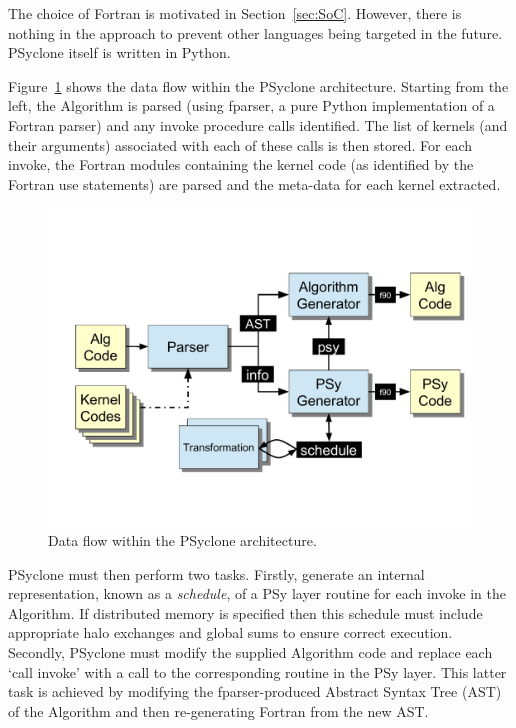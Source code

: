 \documentclass[review,times]{elsarticle}
\begin{document}
The choice of Fortran is motivated in Section~\ref{sec:SoC}. However, there is
nothing in the approach to prevent other languages being targeted in the
future. PSyclone itself is written in Python.

Figure~\ref{fig:psyclone-arch} shows the data flow within the PSyclone
architecture. Starting from the left, the Algorithm is parsed (using
fparser, a pure Python implementation of a Fortran parser) and any
invoke procedure calls identified. The list of kernels (and their arguments)
associated with each of these calls is then stored. For each invoke,
the Fortran modules containing the kernel code (as identified by
the Fortran use statements) are parsed and the meta-data for each kernel
extracted.

\begin{figure}
\centering\includegraphics[width=0.8\linewidth]{Fig5_psyclone_flow.pdf}
\caption{\label{fig:psyclone-arch}Data flow within the PSyclone architecture.}
\end{figure}

PSyclone must then perform two tasks. Firstly, generate an internal
representation, known as a {\em schedule}, of a PSy layer routine for each invoke in
the Algorithm. If distributed memory is specified then this schedule
must include appropriate halo exchanges and global sums to ensure
correct execution. Secondly, PSyclone must modify the supplied Algorithm
code and replace each `call invoke' with a call to the corresponding
routine in the PSy layer. This latter task is achieved by modifying
the fparser-produced Abstract Syntax Tree (AST) of the Algorithm and
then re-generating Fortran from the new AST.
\end{document}
